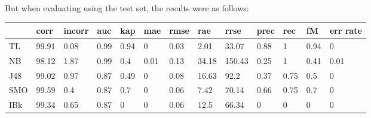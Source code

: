 \documentclass[a4paper,12pt, english]{article}
\begin{document}
But when evaluating using the test set, the results were as follows:
\begin{small}
\begin{center}
    \begin{tabular}{ | l | l | l | l | l | l | l | l | l | l | l | l | l |}
    \hline
      	& corr & incorr  & auc & kap & mae & rmse & rae & rrse & prec & rec & fM & err rate\\ \hline
      	TL & 99.91 & 0.08 & 0.99 & 0.94 & 0 & 0.03 & 2.01 & 33.07 & 0.88 & 1 & 0.94 & 0\\ \hline
	NB & 98.12 & 1.87 & 0.99 & 0.4 & 0.01 & 0.13 & 34.18 & 150.43 & 0.25 & 1 & 0.41 & 0.01\\ \hline
	J48 & 99.02 & 0.97 & 0.87 & 0.49 & 0 & 0.08 & 16.63 & 92.2 & 0.37 & 0.75 & 0.5 & 0\\ \hline
	SMO & 99.59 & 0.4 & 0.87 & 0.7 & 0 & 0.06 & 7.42 & 70.14 & 0.66 & 0.75 & 0.7 & 0\\ \hline
	IBk & 99.34 & 0.65 & 0.87 & 0 & 0 & 0.06 & 12.5 & 66.34 & 0 & 0 & 0 & 0\\ \hline  
    \end{tabular}       
\end{center}
\end{small}

\newpage
\end{document}
